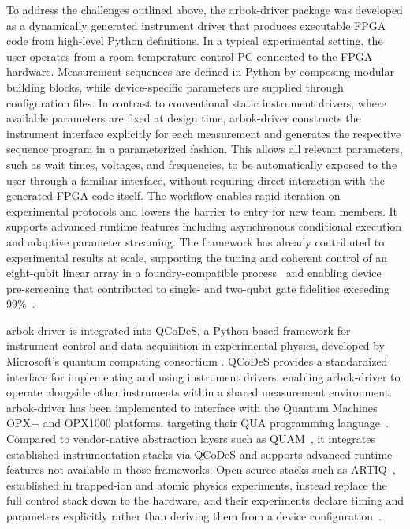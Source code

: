 \documentclass[numbers, preprint, twocolumn,10pt]{elsarticle}
\begin{document}
To address the challenges outlined above, the arbok-driver package was developed as a dynamically generated instrument driver that produces executable FPGA code from high-level Python definitions.
In a typical experimental setting, the user operates from a room-temperature control PC connected to the FPGA hardware. Measurement sequences are defined in Python by composing modular building blocks, while device-specific parameters are supplied through configuration files.
In contrast to conventional static instrument drivers, where available parameters are fixed at design time, arbok-driver constructs the instrument interface explicitly for each measurement and generates the respective sequence program in a parameterized fashion.
This allows all relevant parameters, such as wait times, voltages, and frequencies, to be automatically exposed to the user through a familiar interface, without requiring direct interaction with the generated FPGA code itself.
The workflow enables rapid iteration on experimental protocols and lowers the barrier to entry for new team members.
It supports advanced runtime features including asynchronous conditional execution and adaptive parameter streaming.
The framework has already contributed to experimental results at scale, supporting the tuning and coherent control of an eight-qubit linear array in a foundry-compatible process~\cite{nickl_eight-qubit_2025} and enabling device pre-screening that contributed to single- and two-qubit gate fidelities exceeding 99\%~\cite{steinacker_industry-compatible_2025}.

arbok-driver is integrated into QCoDeS, a Python-based framework for instrument control and data acquisition in experimental physics, developed by Microsoft's quantum computing consortium \cite{qcodes_website}.
QCoDeS provides a standardized interface for implementing and using instrument drivers, enabling arbok-driver to operate alongside other instruments within a shared measurement environment.
arbok-driver has been implemented to interface with the Quantum Machines OPX+ and OPX1000 platforms, targeting their QUA programming language~\cite{qua}. Compared to vendor-native abstraction layers such as QUAM~\cite{quam}, it integrates established instrumentation stacks via QCoDeS and supports advanced runtime features not available in those frameworks.
Open-source stacks such as ARTIQ~\cite{kasprowicz_artiq_2020}, established in trapped-ion and atomic physics experiments, instead replace the full control stack down to the hardware, and their experiments declare timing and parameters explicitly rather than deriving them from a device configuration~\cite{ndscan}.
\end{document}
